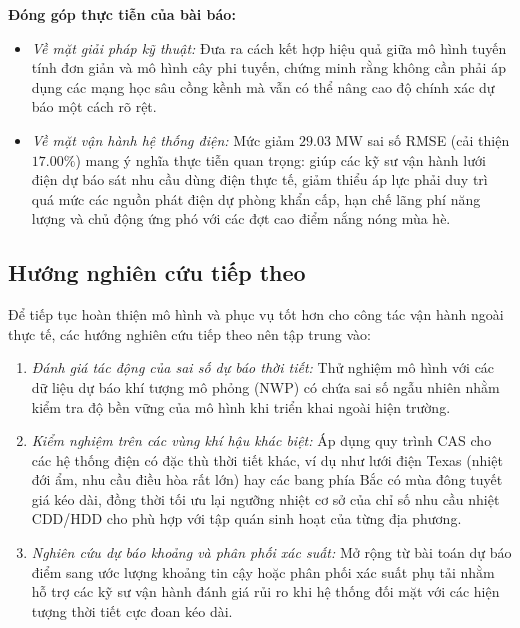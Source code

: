 \textbf{Đóng góp thực tiễn của bài báo:}
\begin{itemize}
    \item \textit{Về mặt giải pháp kỹ thuật:} Đưa ra cách kết hợp hiệu quả giữa mô hình tuyến tính đơn giản và mô hình cây phi tuyến, chứng minh rằng không cần phải áp dụng các mạng học sâu cồng kềnh mà vẫn có thể nâng cao độ chính xác dự báo một cách rõ rệt.
    \item \textit{Về mặt vận hành hệ thống điện:} Mức giảm $29.03\text{ MW}$ sai số RMSE (cải thiện $17.00\%$) mang ý nghĩa thực tiễn quan trọng: giúp các kỹ sư vận hành lưới điện dự báo sát nhu cầu dùng điện thực tế, giảm thiểu áp lực phải duy trì quá mức các nguồn phát điện dự phòng khẩn cấp, hạn chế lãng phí năng lượng và chủ động ứng phó với các đợt cao điểm nắng nóng mùa hè.
\end{itemize}

\subsection{Hướng nghiên cứu tiếp theo}
\label{subsec:future_work}

Để tiếp tục hoàn thiện mô hình và phục vụ tốt hơn cho công tác vận hành ngoài thực tế, các hướng nghiên cứu tiếp theo nên tập trung vào:
\begin{enumerate}
    \item \textit{Đánh giá tác động của sai số dự báo thời tiết:} Thử nghiệm mô hình với các dữ liệu dự báo khí tượng mô phỏng (NWP) có chứa sai số ngẫu nhiên nhằm kiểm tra độ bền vững của mô hình khi triển khai ngoài hiện trường.
    \item \textit{Kiểm nghiệm trên các vùng khí hậu khác biệt:} Áp dụng quy trình CAS cho các hệ thống điện có đặc thù thời tiết khác, ví dụ như lưới điện Texas (nhiệt đới ẩm, nhu cầu điều hòa rất lớn) hay các bang phía Bắc có mùa đông tuyết giá kéo dài, đồng thời tối ưu lại ngưỡng nhiệt cơ sở của chỉ số nhu cầu nhiệt CDD/HDD cho phù hợp với tập quán sinh hoạt của từng địa phương.
    \item \textit{Nghiên cứu dự báo khoảng và phân phối xác suất:} Mở rộng từ bài toán dự báo điểm sang ước lượng khoảng tin cậy hoặc phân phối xác suất phụ tải nhằm hỗ trợ các kỹ sư vận hành đánh giá rủi ro khi hệ thống đối mặt với các hiện tượng thời tiết cực đoan kéo dài.
\end{enumerate}
